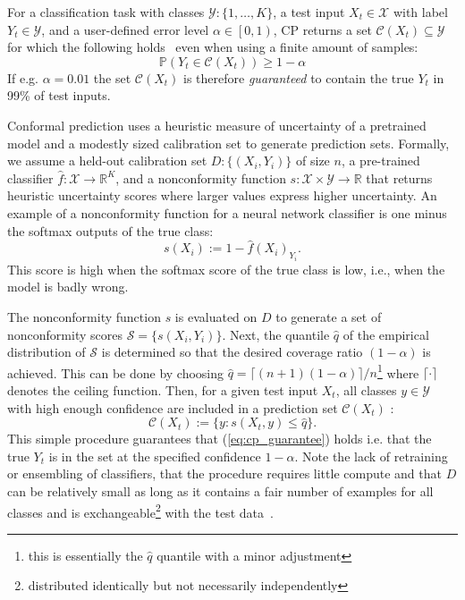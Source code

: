 \documentclass[11pt]{article}
\begin{document}
For a classification task with classes $\mathcal{Y}: \{1,\dots,K\}$, a test input $X_{t}\in\mathcal{X}$ with label $Y_{t} \in \mathcal{Y}$, and a user-defined error level $\alpha \in \left[0,1\right)$, CP returns a set $\mathcal{C}(X_t)\subseteq \mathcal{Y}$ for which the following holds~\cite{vovk1999machine} even when using a finite amount of samples:
\begin{equation}
\label{eq:cp_guarantee}
\mathbb{P}\left(Y_t \in \mathcal{C}(X_t)\right) \geq 1 - \alpha
\end{equation}
If e.g. $\alpha=0.01$ the set $\mathcal{C}(X_t)$ is therefore \emph{guaranteed} to contain the true $Y_t$ in 99\% of test inputs.

Conformal prediction uses a heuristic measure of uncertainty of a pretrained model and a modestly sized calibration set to generate prediction sets. Formally, we assume a held-out calibration set $D: \{(X_i, Y_i)\}$ of size $n$, a pre-trained classifier $\hat{f}: \mathcal{X} \to \mathbb{R}^K$, and a nonconformity function $s: \mathcal{X}\times\mathcal{Y}\to\mathbb{R}$ that returns heuristic uncertainty scores where larger values express higher uncertainty. An example of a nonconformity function for a neural network classifier is one minus the softmax outputs of the true class:
\begin{equation}
    \label{eq:marginal_cp}
    s(X_i) := 1-\hat{f}(X_i)_{Y_i}.
\end{equation}
This score is high when the softmax score of the true class is low, i.e., when the model is badly wrong.

The nonconformity function $s$ is evaluated on $D$ to generate a set of nonconformity scores $\mathcal{S} = \{s(X_i, Y_i)\}$. Next, the quantile $\hat{q}$ of the empirical distribution of $\mathcal{S}$ is determined so that the desired coverage ratio $(1-\alpha)$ is achieved. This can be done by choosing $\hat{q}=\lceil(n+1)(1-\alpha)\rceil/n$\footnote{this is essentially the $\hat{q}$ quantile with a minor adjustment} where $\lceil\cdot\rceil$ denotes the ceiling function. Then, for a given test input $X_t$, all classes $y \in \mathcal{Y}$ with high enough confidence are included in a prediction set $\mathcal{C}(X_t)$ :
\begin{equation}
    \label{eq:prediction_set}
    \mathcal{C}(X_t) := \{y: s(X_t, y) \leq \hat{q}\}.
\end{equation}
This simple procedure guarantees that (\ref{eq:cp_guarantee}) holds i.e. that the true $Y_t$ is in the set at the specified confidence $1-\alpha$. Note the lack of retraining or ensembling of classifiers, that the procedure requires little compute and that $D$ can be relatively small as long as it contains a fair number of examples for all classes and is exchangeable\footnote{distributed identically but not necessarily independently} with the test data~\cite{papadopoulos2002inductive}.
\end{document}

